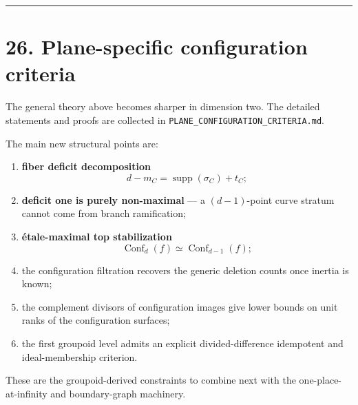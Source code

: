 \begin{center}\rule{0.5\linewidth}{0.5pt}\end{center}

\section{26. Plane-specific configuration
criteria}\label{plane-specific-configuration-criteria}

The general theory above becomes sharper in dimension two. The detailed
statements and proofs are collected in
\texttt{PLANE\_CONFIGURATION\_CRITERIA.md}.

The main new structural points are:

\begin{enumerate}
\def\labelenumi{\arabic{enumi}.}
\tightlist
\item
  \textbf{fiber deficit decomposition} \[
  d-m_C=\operatorname{supp}(\sigma_C)+t_C;
  \]
\item
  \textbf{deficit one is purely non-maximal} --- a \((d-1)\)-point curve
  stratum cannot come from branch ramification;
\item
  \textbf{étale-maximal top stabilization} \[
  \operatorname{Conf}_d(f)\simeq\operatorname{Conf}_{d-1}(f);
  \]
\item
  the configuration filtration recovers the generic deletion counts once
  inertia is known;
\item
  the complement divisors of configuration images give lower bounds on
  unit ranks of the configuration surfaces;
\item
  the first groupoid level admits an explicit divided-difference
  idempotent and ideal-membership criterion.
\end{enumerate}

These are the groupoid-derived constraints to combine next with the
one-place-at-infinity and boundary-graph machinery.

